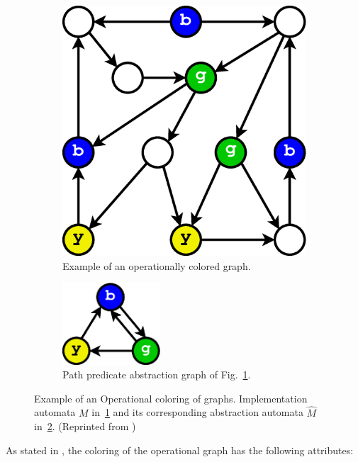 \begin{figure}[htb!]
\centering
\begin{subfigure}[b]{0.4\textwidth}
  \centering
  \includegraphics[width=0.75\linewidth]{images/nutshell-answer.eps}
  \caption{Example of an operationally colored graph.}
  \label{fig:imp-ppa}
\end{subfigure}
\hfill
\begin{subfigure}[b]{0.4\textwidth}
  \centering
  \includegraphics[width=0.4\textwidth]{images/nutshell-abstraction.eps}
  \vspace{3ex}
  \caption{Path predicate abstraction graph of Fig.~\ref{fig:imp-ppa}.}
  \label{fig:abs-ppa}
\end{subfigure}
\caption{Example of an Operational coloring of graphs. Implementation automata $M$ in~\ref{fig:imp-ppa} and its corresponding abstraction automata $\hat{M}$ in~\ref{fig:abs-ppa}. (Reprinted from \cite{paper-pdd})}
\label{fig:oper-graph}
\end{figure}

As stated in \cite{paper-pdd}, the coloring of the operational graph has the following attributes:

